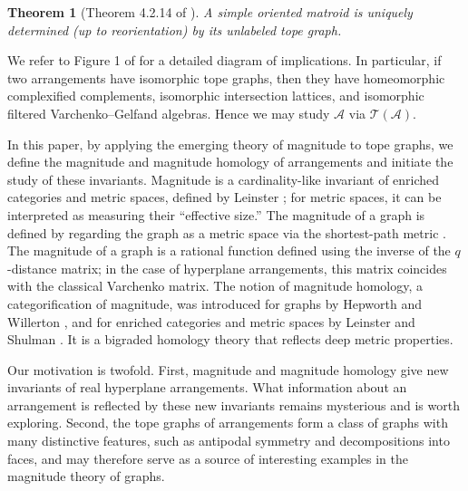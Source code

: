 \documentclass{amsart}
\numberwithin{equation}{section}
\newtheorem{thm}{Theorem}[section]
\theoremstyle{plain}
\theoremstyle{remark}
\theoremstyle{definition}
\numberwithin{equation}{section}
\newcommand{\A}{\mathcal{A}}
\newcommand{\T}{\mathcal{T}}
\begin{document}
\begin{thm}[Theorem 4.2.14 of \cite{Bjorner1999}]
    A simple oriented matroid is uniquely determined (up to reorientation) by its unlabeled tope graph.    
\end{thm}

We refer to Figure 1 of \cite{Yagi2026} for a detailed diagram of implications. In particular, if two arrangements have isomorphic tope graphs, then they have homeomorphic complexified complements, isomorphic intersection lattices, and isomorphic filtered Varchenko--Gelfand algebras. Hence we may study $\A$ via $\T(\A)$.

In this paper, by applying the emerging theory of magnitude to tope graphs, we define the magnitude and magnitude homology of arrangements and initiate the study of these invariants.
Magnitude is a cardinality-like invariant of enriched categories and metric spaces, defined by Leinster \cite{Leinster2013,Leinster2017}; for metric spaces, it can be interpreted as measuring their ``effective size.''
The magnitude of a graph is defined by regarding the graph as a metric space via the shortest-path metric \cite{Leinster2019}.
The magnitude of a graph is a rational function defined using the inverse of the $q$-distance matrix; in the case of hyperplane arrangements, this matrix coincides with the classical Varchenko matrix.
The notion of magnitude homology, a categorification of magnitude, was introduced for graphs by Hepworth and Willerton \cite{Hepworth2017}, and for enriched categories and metric spaces by Leinster and Shulman \cite{Leinster2021}.
It is a bigraded homology theory that reflects deep metric properties.

Our motivation is twofold.
First, magnitude and magnitude homology give new invariants of real hyperplane arrangements.
What information about an arrangement is reflected by these new invariants remains mysterious and is worth exploring.
Second, the tope graphs of arrangements form a class of graphs with many distinctive features, such as antipodal symmetry and decompositions into faces, and may therefore serve as a source of interesting examples in the magnitude theory of graphs.
\end{document}
